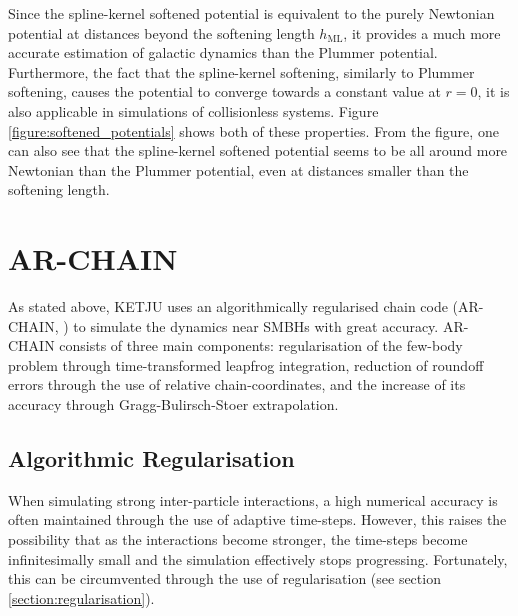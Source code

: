 \documentclass[english, twoside]{HYgradu}
\begin{document}
Since the spline-kernel softened potential is equivalent to the purely Newtonian potential at distances beyond the softening length $h_\mathrm{ML}$, it provides a much more accurate estimation of galactic dynamics than the Plummer potential. Furthermore, the fact that the spline-kernel softening, similarly to Plummer softening, causes the potential to converge towards a constant value at $r=0$, it is also applicable in simulations of collisionless systems. Figure \ref{figure:softened_potentials} shows both of these properties. From the figure, one can also see that the spline-kernel softened potential seems to be all around more Newtonian than the Plummer potential, even at distances smaller than the softening length.


\section{AR-CHAIN} \label{section:ar-chain}

As stated above, KETJU uses an algorithmically regularised chain code (AR-CHAIN, \citealt{Mikkola2008ARCHAIN}) to simulate the dynamics near SMBHs with great accuracy. AR-CHAIN consists of three main components: regularisation of the few-body problem through time-transformed leapfrog integration, reduction of roundoff errors through the use of relative chain-coordinates, and the increase of its accuracy through Gragg-Bulirsch-Stoer extrapolation.

\subsection{Algorithmic Regularisation}

When simulating strong inter-particle interactions, a high numerical accuracy is often maintained through the use of adaptive time-steps. However, this raises the possibility that as the interactions become stronger, the time-steps become infinitesimally small and the simulation effectively stops progressing. Fortunately, this can be circumvented through the use of regularisation (see section \ref{section:regularisation}). 
\end{document}
